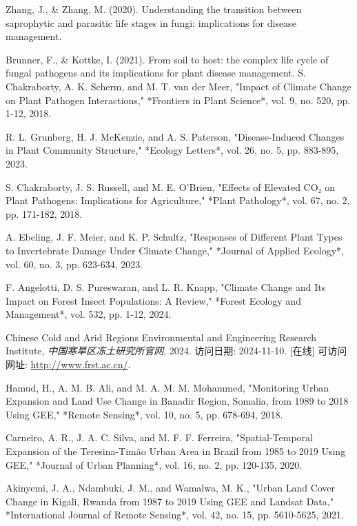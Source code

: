 \documentclass{article}
\begin{document}
\begin{thebibliography}{99}
 Zhang, J., \& Zhang, M. (2020). Understanding the transition between saprophytic and parasitic life stages in fungi: implications for disease management.

 Brunner, F., \& Kottke, I. (2021). From soil to host: the complex life cycle of fungal pathogens and its implications for plant disease management.
 S. Chakraborty, A. K. Scherm, and M. T. van der Meer, "Impact of Climate Change on Plant Pathogen Interactions," *Frontiers in Plant Science*, vol. 9, no. 520, pp. 1-12, 2018.

 R. L. Grunberg, H. J. McKenzie, and A. S. Paterson, "Disease-Induced Changes in Plant Community Structure," *Ecology Letters*, vol. 26, no. 5, pp. 883-895, 2023.

 S. Chakraborty, J. S. Russell, and M. E. O'Brien, "Effects of Elevated CO₂ on Plant Pathogens: Implications for Agriculture," *Plant Pathology*, vol. 67, no. 2, pp. 171-182, 2018.

 A. Ebeling, J. F. Meier, and K. P. Schultz, "Responses of Different Plant Types to Invertebrate Damage Under Climate Change," *Journal of Applied Ecology*, vol. 60, no. 3, pp. 623-634, 2023.

 F. Angelotti, D. S. Pureswaran, and L. R. Knapp, "Climate Change and Its Impact on Forest Insect Populations: A Review," *Forest Ecology and Management*, vol. 532, pp. 1-12, 2024.

 Chinese Cold and Arid Regions Environmental and Engineering Research Institute, \textit{中国寒旱区冻土研究所官网}, 2024. 访问日期: 2024-11-10. [在线] 可访问网址: \url{http://www.frst.ac.cn/}.



 Hamud, H., A. M. B. Ali, and M. A. M. M. Mohammed, "Monitoring Urban Expansion and Land Use Change in Banadir Region, Somalia, from 1989 to 2018 Using GEE," *Remote Sensing*, vol. 10, no. 5, pp. 678-694, 2018.

 Carneiro, A. R., J. A. C. Silva, and M. F. F. Ferreira, "Spatial-Temporal Expansion of the Teresina-Timão Urban Area in Brazil from 1985 to 2019 Using GEE," *Journal of Urban Planning*, vol. 16, no. 2, pp. 120-135, 2020.

 Akinyemi, J. A., Ndambuki, J. M., and Wamalwa, M. K., "Urban Land Cover Change in Kigali, Rwanda from 1987 to 2019 Using GEE and Landsat Data," *International Journal of Remote Sensing*, vol. 42, no. 15, pp. 5610-5625, 2021.


\end{thebibliography}
\end{document}
